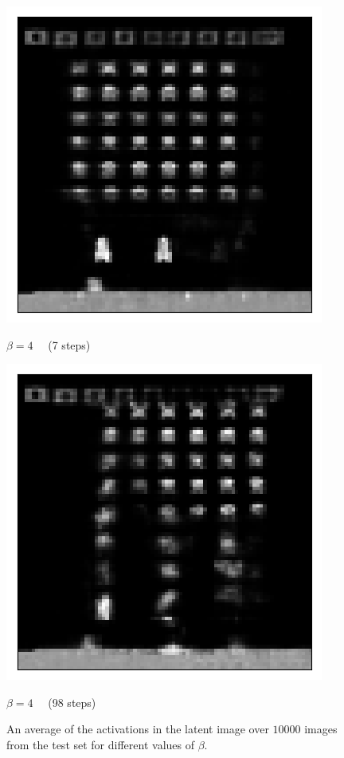 \begin{figure}[h!]
\begin{multicols}{4}
    \includegraphics[scale=0.4]{figures/results/indiscriminate_decoupling/beta_4_posterior_sample_7.png}
    \caption{$\beta=4\quad$ (7 steps)}
    \includegraphics[scale=0.4]{figures/results/indiscriminate_decoupling/beta_4_posterior_sample_98.png}
    \caption{$\beta=4\quad$ (98 steps)}
\end{multicols}

\caption{An average of the activations in the latent image over $10000$ images from the test set for different values of $\beta$.}
\label{fig:indiscriminate_decoupling_posterior_samples}
\end{figure}


